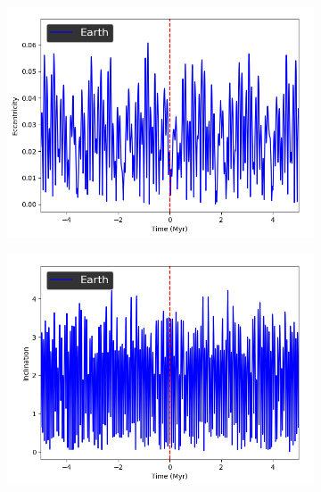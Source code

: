 \documentclass[11pt, oneside]{article}   	%
\begin{document}
\begin{figure}[!h]
	\ContinuedFloat
    \centering
    \begin{subfigure}[t]{0.49\textwidth}
    \captionsetup{width=0.9\textwidth}
	\centering
       	 \includegraphics[width=\textwidth]{Eccentricity_Earth}
    \end{subfigure}
    \begin{subfigure}[t]{0.49\textwidth}
    \captionsetup{width=0.9\textwidth}
        	\centering
	\includegraphics[width=\textwidth]{Inclination_Earth}
    \end{subfigure}
\end{figure}
\end{document}
